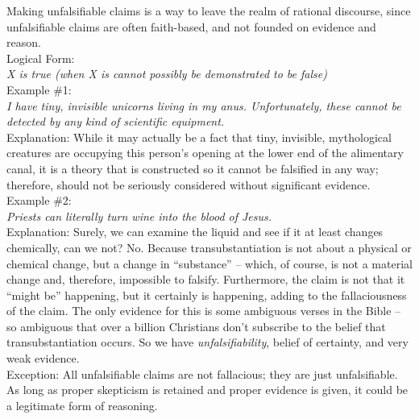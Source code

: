 \documentclass[a4paper,12pt,single,pdftex]{scrbook}
\begin{document}
      
        Making unfalsifiable claims is a way to leave the realm of rational discourse, since unfalsifiable claims are often faith-based, and not founded on evidence and reason.
      \\

      
        Logical Form:
      \\

      
        {\em X is true (when X is cannot possibly be demonstrated to be false)}
      \\

      
        Example \#1:
      \\

      
        {\em I have tiny, invisible unicorns living in my anus.  Unfortunately, these cannot be detected by any kind of scientific equipment.}
      \\

      
        Explanation: While it may actually be a fact that tiny, invisible, mythological creatures are occupying this person’s opening at the lower end of the alimentary canal, it is a theory that is constructed so it cannot be falsified in any way; therefore, should not be seriously considered without significant evidence.
      \\

      
        Example \#2:
      \\

      
        {\em Priests can literally turn wine into the blood of Jesus.}
      \\

      
        Explanation: Surely, we can examine the liquid and see if it at least changes chemically, can we not?  No.  Because transubstantiation is not about a physical or chemical change, but a change in “substance” -- which, of course, is not a material change and, therefore, impossible to falsify.  Furthermore, the claim is not that it “might be” happening, but it certainly is happening, adding to the fallaciousness of the claim.  The only evidence for this is some ambiguous verses in the Bible -- so ambiguous that over a billion Christians don’t subscribe to the belief that transubstantiation occurs.  So we have {\it unfalsifiability}, belief of certainty, and very weak evidence.
      \\

      
        Exception: All unfalsifiable claims are not fallacious; they are just unfalsifiable.  As long as proper skepticism is retained and proper evidence is given, it could be a legitimate form of reasoning.
      \\
\end{document}

